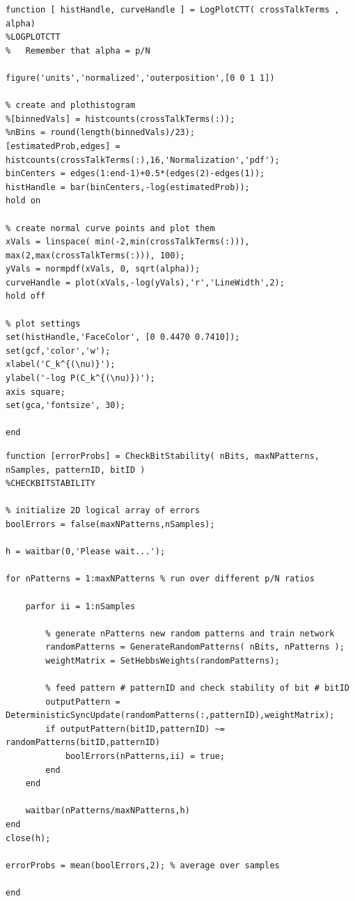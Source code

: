 \documentclass[12pt,A4,titlepage]{article}
\begin{document}
\bigskip

\bigskip
\begin{lstlisting}
function [ histHandle, curveHandle ] = LogPlotCTT( crossTalkTerms , alpha)
%LOGPLOTCTT
%   Remember that alpha = p/N

figure('units','normalized','outerposition',[0 0 1 1])

% create and plothistogram
%[binnedVals] = histcounts(crossTalkTerms(:));
%nBins = round(length(binnedVals)/23);
[estimatedProb,edges] = histcounts(crossTalkTerms(:),16,'Normalization','pdf');
binCenters = edges(1:end-1)+0.5*(edges(2)-edges(1));
histHandle = bar(binCenters,-log(estimatedProb));
hold on

% create normal curve points and plot them
xVals = linspace( min(-2,min(crossTalkTerms(:))), max(2,max(crossTalkTerms(:))), 100);
yVals = normpdf(xVals, 0, sqrt(alpha));
curveHandle = plot(xVals,-log(yVals),'r','LineWidth',2);
hold off

% plot settings
set(histHandle,'FaceColor', [0 0.4470 0.7410]);
set(gcf,'color','w');
xlabel('C_k^{(\nu)}');
ylabel('-log P(C_k^{(\nu)})');
axis square;
set(gca,'fontsize', 30);

end
\end{lstlisting}

\begin{lstlisting}
function [errorProbs] = CheckBitStability( nBits, maxNPatterns, nSamples, patternID, bitID )
%CHECKBITSTABILITY

% initialize 2D logical array of errors
boolErrors = false(maxNPatterns,nSamples);

h = waitbar(0,'Please wait...');

for nPatterns = 1:maxNPatterns % run over different p/N ratios
    
    parfor ii = 1:nSamples

        % generate nPatterns new random patterns and train network
        randomPatterns = GenerateRandomPatterns( nBits, nPatterns );
        weightMatrix = SetHebbsWeights(randomPatterns);

        % feed pattern # patternID and check stability of bit # bitID
        outputPattern = DeterministicSyncUpdate(randomPatterns(:,patternID),weightMatrix);
        if outputPattern(bitID,patternID) ~= randomPatterns(bitID,patternID)
            boolErrors(nPatterns,ii) = true;
        end
    end

    waitbar(nPatterns/maxNPatterns,h)
end
close(h);

errorProbs = mean(boolErrors,2); % average over samples

end
\end{lstlisting}
\end{document}
